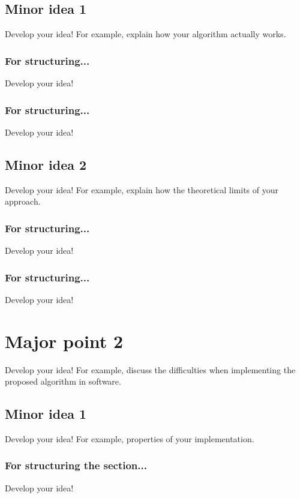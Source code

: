 \subsection{Minor idea 1}
\label{s:Contribution-2-Major-1-Minor-1}
Develop your idea! For example, explain how your algorithm actually works.

\subsubsection{For structuring...}
Develop your idea!

\subsubsection{For structuring...}
Develop your idea!

\subsection{Minor idea 2}
\label{s:Contribution-2-Major-1-Minor-2}
Develop your idea! For example, explain how the theoretical limits of your approach.

\subsubsection{For structuring...}
Develop your idea!

\subsubsection{For structuring...}
Develop your idea!

\section{Major point 2}
\label{s:Contribution-2-Major-2}
Develop your idea! For example, discuss the difficulties when implementing the proposed algorithm in software.

\subsection{Minor idea 1}
\label{s:Contribution-2-Major-2-Minor-1}
Develop your idea! For example, properties of your implementation.

\subsubsection{For structuring the section...}
Develop your idea!

